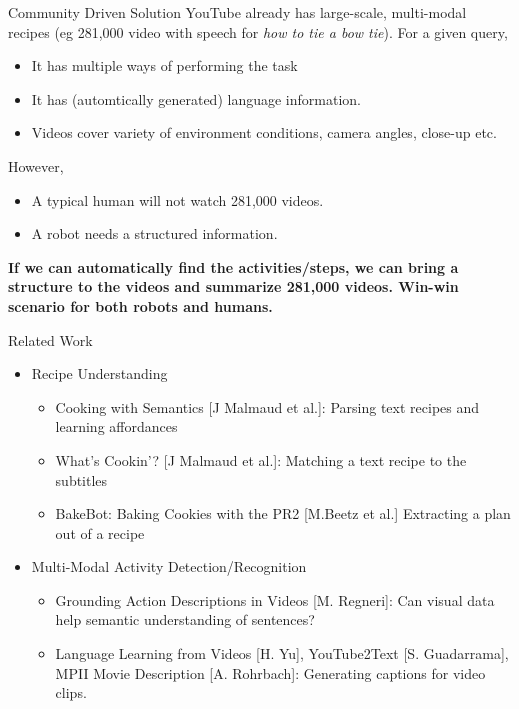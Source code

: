 \begin{frame}{Community Driven Solution}
YouTube already has large-scale, multi-modal recipes (eg 281,000 video with speech for \emph{how to tie a bow tie}). For a given query,
\begin{itemize}
  \item It has multiple ways of performing the task
  \item It has (automtically generated) language information.
  \item Videos cover variety of environment conditions, camera angles, close-up etc.
\end{itemize}
However,
\begin{itemize}
  \item A typical human will not watch 281,000 videos.
  \item A robot needs a structured information.
\end{itemize}
\vspace{0.7cm}
\textbf{If we can automatically find the activities/steps, we can bring a structure to the videos and summarize 281,000 videos. Win-win scenario for both robots and humans.}
\end{frame}


\begin{frame}{Related Work}
  \begin{itemize}
  \item Recipe Understanding
    \begin{itemize}
      \item Cooking with Semantics [J Malmaud et al.]: Parsing text recipes and learning affordances
      \item What's Cookin'?  [J Malmaud et al.]: Matching a text recipe to the subtitles
      \item BakeBot: Baking Cookies with the PR2 [M.Beetz et al.] Extracting a plan out of a recipe
    \end{itemize}
  \item Multi-Modal Activity Detection/Recognition
    \begin{itemize}
      \item Grounding Action Descriptions in Videos [M. Regneri]: Can visual data help semantic understanding of sentences?
      \item Language Learning from Videos [H. Yu], YouTube2Text [S. Guadarrama], MPII Movie Description [A. Rohrbach]: Generating captions for video clips.
    \end{itemize}
  \end{itemize}
\end{frame}

